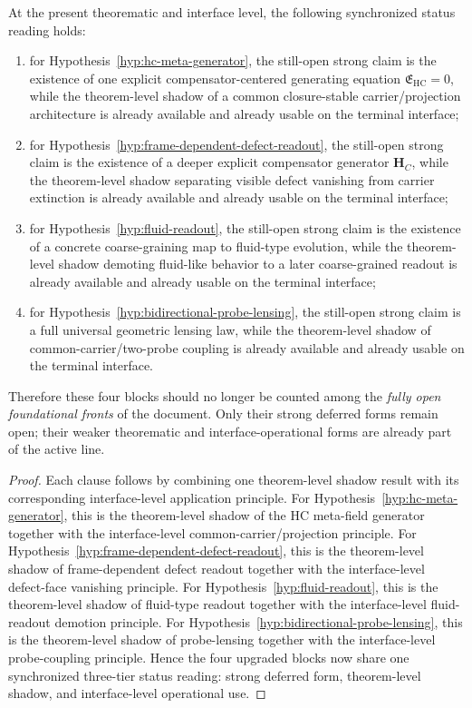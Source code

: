 \begin{proposition}
\label{prop:v321-hypothesis-open-question-status-synchronization-principle}
At the present theorematic and interface level, the following synchronized status reading holds:
\begin{enumerate}[leftmargin=2em,label=(\roman*)]
 \item for Hypothesis~\ref{hyp:hc-meta-generator}, the still-open strong claim is the existence of one explicit compensator-centered generating equation $\mathfrak E_{\mathrm{HC}}=0$, while the theorem-level shadow of a common closure-stable carrier/projection architecture is already available and already usable on the terminal interface;
 \item for Hypothesis~\ref{hyp:frame-dependent-defect-readout}, the still-open strong claim is the existence of a deeper explicit compensator generator $\mathbf H_C$, while the theorem-level shadow separating visible defect vanishing from carrier extinction is already available and already usable on the terminal interface;
 \item for Hypothesis~\ref{hyp:fluid-readout}, the still-open strong claim is the existence of a concrete coarse-graining map to fluid-type evolution, while the theorem-level shadow demoting fluid-like behavior to a later coarse-grained readout is already available and already usable on the terminal interface;
 \item for Hypothesis~\ref{hyp:bidirectional-probe-lensing}, the still-open strong claim is a full universal geometric lensing law, while the theorem-level shadow of common-carrier/two-probe coupling is already available and already usable on the terminal interface.
\end{enumerate}
Therefore these four blocks should no longer be counted among the \emph{fully open foundational fronts} of the document. Only their strong deferred forms remain open; their weaker theorematic and interface-operational forms are already part of the active line.
\end{proposition}

\begin{proof}
Each clause follows by combining one theorem-level shadow result with its corresponding interface-level application principle. For Hypothesis~\ref{hyp:hc-meta-generator}, this is the theorem-level shadow of the HC meta-field generator together with the interface-level common-carrier/projection principle. For Hypothesis~\ref{hyp:frame-dependent-defect-readout}, this is the theorem-level shadow of frame-dependent defect readout together with the interface-level defect-face vanishing principle. For Hypothesis~\ref{hyp:fluid-readout}, this is the theorem-level shadow of fluid-type readout together with the interface-level fluid-readout demotion principle. For Hypothesis~\ref{hyp:bidirectional-probe-lensing}, this is the theorem-level shadow of probe-lensing together with the interface-level probe-coupling principle. Hence the four upgraded blocks now share one synchronized three-tier status reading: strong deferred form, theorem-level shadow, and interface-level operational use.
\end{proof}

